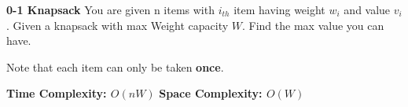 \textbf{0-1 Knapsack}
You are given n items with $i_{th}$ item having weight  $w_i$ and value $v_i$. Given a knapsack with max Weight capacity $W$. Find the max value you can have.

Note that each item can only be taken \textbf{once}.

\textbf{Time Complexity: $O(nW)$}
\textbf{Space Complexity: $O(W)$}
